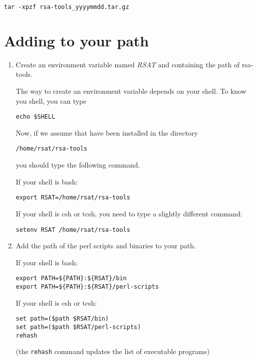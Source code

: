 \documentclass{book}
\begin{document}
\begin{verbatim}
tar -xpzf rsa-tools_yyyymmdd.tar.gz
\end{verbatim}

\section{Adding \RSAT to your path}

\begin{enumerate}

\item Create an environment variable named \textit{RSAT} and
  containing the path of rsa-tools.

  The way to create an environment variable depends on your shell. To
  know you shell, you can type

\begin{verbatim}
echo $SHELL
\end{verbatim}

Now, if we assume that \RSAT have been installed in the directory

\begin{verbatim}
/home/rsat/rsa-tools
\end{verbatim}

you should type the following command.

If your shell is bash:
\begin{verbatim}
export RSAT=/home/rsat/rsa-tools
\end{verbatim}

If your shell is csh or tcsh, you need to type a slightly different
command:

\begin{verbatim}
setenv RSAT /home/rsat/rsa-tools
\end{verbatim}

\item Add the path of the \RSAT perl scripts and binaries to your
  path.

If your shell is bash:
\begin{verbatim}
export PATH=${PATH}:${RSAT}/bin
export PATH=${PATH}:${RSAT}/perl-scripts
\end{verbatim}

If your shell is csh or tcsh:
\begin{verbatim}
set path=($path $RSAT/bin)
set path=($path $RSAT/perl-scripts)
rehash
\end{verbatim}

(the \texttt{rehash} command updates the list of executable programs)

\end{enumerate}
\end{document}
